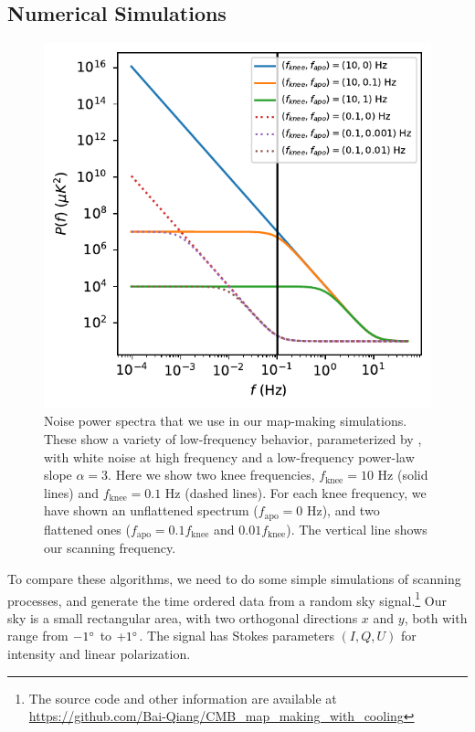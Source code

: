 \documentclass[twocolumn,linenumbers]{aastex631}
\newcommand{\Eq}[1]{\text{Eq.\,\ref{#1}}}
\begin{document}
\begin{CJK*}{UTF8}{gbsn}
\subsection{Numerical Simulations}

\begin{figure}[tb!]
\includegraphics[width=\linewidth]{P_f.pdf}
\centering
\caption{Noise power spectra that we use in our map-making simulations.
    These show a variety of low-frequency behavior,
    parameterized by \Eq{noise power spectrum},
    with white noise at high frequency and a low-frequency power-law slope $\alpha = 3$.
    Here we show two knee frequencies, $f_\text{knee}=10$ Hz (solid lines)  
    and $f_\text{knee}=0.1$ Hz (dashed lines).
    For each knee frequency, we have shown an unflattened spectrum ($f_\text{apo}=0$ Hz), and two flattened ones ($f_\text{apo}=0.1f_\text{knee}$ and
    $0.01f_\text{knee}$).
    The vertical line shows our scanning frequency.
}
\label{power spectrum}
\end{figure}

To compare these algorithms, we need to do some simple {simulations} of scanning
processes, and generate {the} time ordered data from a random sky signal.\footnote{
The source code and other information are available at \url{https://github.com/Bai-Qiang/CMB_map_making_with_cooling}
}
Our sky is a small rectangular area, with two orthogonal directions $x$ and
$y$, both with range from $-1\degree$ to $+1\degree$.
The signal has Stokes parameters $(I,Q,U)$ for intensity and linear polarization.


\end{CJK*}
\end{document}
